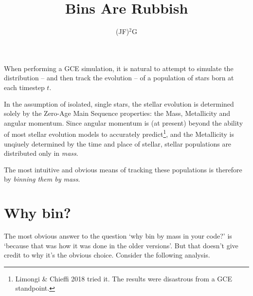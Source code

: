 \documentclass[a4paper,11pt]{article}
\title{Bins Are Rubbish}
\author{(JF)$^2$G}
\begin{document}
	\setcounter{tocdepth}{2}
	\maketitle

	When performing a GCE simulation, it is natural to attempt to simulate the distribution -- and then track the evolution -- of a population of stars born at each timestep $t$. 

	In the assumption of isolated, single stars, the stellar evolution is determined solely by the Zero-Age Main Sequence properties: the Mass, Metallicity and angular momentum. Since angular momentum is (at present) beyond the ability of most stellar evolution models to accurately predict\footnote{Limongi \& Chieffi 2018 tried it. The results were disastrous from a GCE standpoint.}, and the Metallicity is unqiuely determined by the time and place of stellar, stellar populations are distributed only in \textit{mass}.

	The most intuitive and obvious means of tracking these populations is therefore by \textit{binning them by mass}.
	
	\section{Why bin?}

		The most obvious answer to the question `why bin by mass in your code?' is `because that was how it was done in the older versions'. But that doesn't give credit to why it's the obvious choice. Consider the following analysis.

\end{document}
